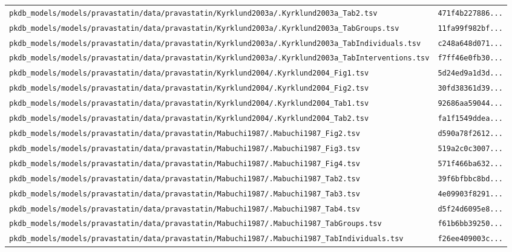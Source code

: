 \documentclass{article}
\begin{document}
\begin{longtable}{ll}
\texttt{pkdb\_models/models/pravastatin/data/pravastatin/Kyrklund2003a/.Kyrklund2003a\_Tab2.tsv} & \texttt{471f4b227886...} \\
\texttt{pkdb\_models/models/pravastatin/data/pravastatin/Kyrklund2003a/.Kyrklund2003a\_TabGroups.tsv} & \texttt{11fa99f982bf...} \\
\texttt{pkdb\_models/models/pravastatin/data/pravastatin/Kyrklund2003a/.Kyrklund2003a\_TabIndividuals.tsv} & \texttt{c248a648d071...} \\
\texttt{pkdb\_models/models/pravastatin/data/pravastatin/Kyrklund2003a/.Kyrklund2003a\_TabInterventions.tsv} & \texttt{f7ff46e0fb30...} \\
\texttt{pkdb\_models/models/pravastatin/data/pravastatin/Kyrklund2004/.Kyrklund2004\_Fig1.tsv} & \texttt{5d24ed9a1d3d...} \\
\texttt{pkdb\_models/models/pravastatin/data/pravastatin/Kyrklund2004/.Kyrklund2004\_Fig2.tsv} & \texttt{30fd38361d39...} \\
\texttt{pkdb\_models/models/pravastatin/data/pravastatin/Kyrklund2004/.Kyrklund2004\_Tab1.tsv} & \texttt{92686aa59044...} \\
\texttt{pkdb\_models/models/pravastatin/data/pravastatin/Kyrklund2004/.Kyrklund2004\_Tab2.tsv} & \texttt{fa1f1549ddea...} \\
\texttt{pkdb\_models/models/pravastatin/data/pravastatin/Mabuchi1987/.Mabuchi1987\_Fig2.tsv} & \texttt{d590a78f2612...} \\
\texttt{pkdb\_models/models/pravastatin/data/pravastatin/Mabuchi1987/.Mabuchi1987\_Fig3.tsv} & \texttt{519a2c0c3007...} \\
\texttt{pkdb\_models/models/pravastatin/data/pravastatin/Mabuchi1987/.Mabuchi1987\_Fig4.tsv} & \texttt{571f466ba632...} \\
\texttt{pkdb\_models/models/pravastatin/data/pravastatin/Mabuchi1987/.Mabuchi1987\_Tab2.tsv} & \texttt{39f6bfbbc8bd...} \\
\texttt{pkdb\_models/models/pravastatin/data/pravastatin/Mabuchi1987/.Mabuchi1987\_Tab3.tsv} & \texttt{4e09903f8291...} \\
\texttt{pkdb\_models/models/pravastatin/data/pravastatin/Mabuchi1987/.Mabuchi1987\_Tab4.tsv} & \texttt{d5f24d6095e8...} \\
\texttt{pkdb\_models/models/pravastatin/data/pravastatin/Mabuchi1987/.Mabuchi1987\_TabGroups.tsv} & \texttt{f61b6bb39250...} \\
\texttt{pkdb\_models/models/pravastatin/data/pravastatin/Mabuchi1987/.Mabuchi1987\_TabIndividuals.tsv} & \texttt{f26ee409003c...} \\

\end{longtable}
\end{document}
